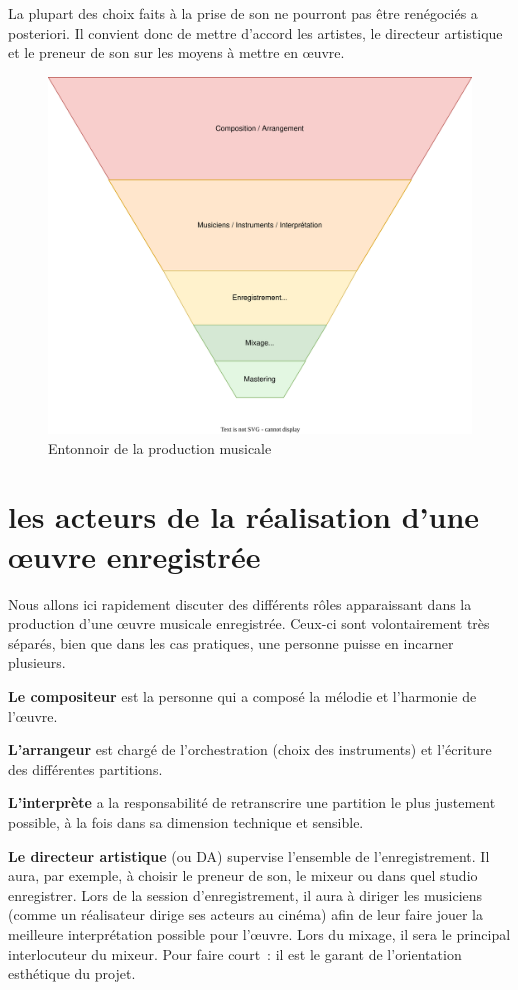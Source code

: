 \documentclass[
]{book}
\begin{document}
La plupart des choix faits à la prise de son ne pourront pas être renégociés a posteriori. Il convient donc de mettre d'accord les artistes, le directeur artistique et le preneur de son sur les moyens à mettre en œuvre.

\begin{figure}
\includegraphics[width=0.8\linewidth]{_resources/diagrams/productionSonore} \caption{Entonnoir de la production musicale}\label{fig:unnamed-chunk-14}
\end{figure}

\hypertarget{les-acteurs-de-la-ruxe9alisation-dune-ux153uvre-enregistruxe9e}{%
\section{les acteurs de la réalisation d'une œuvre enregistrée}\label{les-acteurs-de-la-ruxe9alisation-dune-ux153uvre-enregistruxe9e}}

Nous allons ici rapidement discuter des différents rôles apparaissant dans la production d'une œuvre musicale enregistrée. Ceux-ci sont volontairement très séparés, bien que dans les cas pratiques, une personne puisse en incarner plusieurs.

\textbf{Le compositeur} est la personne qui a composé la mélodie et l'harmonie de l'œuvre.

\textbf{L'arrangeur} est chargé de l'orchestration (choix des instruments) et l'écriture des différentes partitions.

\textbf{L'interprète} a la responsabilité de retranscrire une partition le plus justement possible, à la fois dans sa dimension technique et sensible.

\textbf{Le directeur artistique} (ou DA) supervise l'ensemble de l'enregistrement. Il aura, par exemple, à choisir le preneur de son, le mixeur ou dans quel studio enregistrer. Lors de la session d'enregistrement, il aura à diriger les musiciens (comme un réalisateur dirige ses acteurs au cinéma) afin de leur faire jouer la meilleure interprétation possible pour l'œuvre. Lors du mixage, il sera le principal interlocuteur du mixeur. Pour faire court~: il est le garant de l'orientation esthétique du projet.
\end{document}
